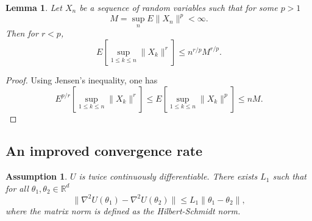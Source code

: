 \documentclass[a4paper]{article}
\newtheorem{lemma}[theorem]{Lemma}
\newtheorem{assumption}[theorem]{Assumption}
\begin{document}
\begin{lemma}\label{maximal}
	Let $X_n$ be a sequence of random variables such that for some $p > 1$
	$$M = \sup_n E\|X_n\|^p < \infty.$$
	Then for $r < p$,
	$$ E\left[ \sup_{1 \le k \le n}\|X_k\|^r \right] \le n^{r/p} M^{r/p}.$$
\end{lemma}
\begin{proof}
	Using Jensen's inequality, one has
	$$E^{p/r}\left[ \sup_{1 \le k \le n}\|X_k\|^r \right] \le E \left[ \sup_{1 \le k \le n}\|X_k\|^p \right] \le nM.$$
\end{proof}

\subsection{An improved convergence rate}\label{sec_rate1}

\begin{assumption}\label{assrate1} $U$ is twice continuously differentiable. There exists $L_1$ such that for all $\theta_1, \theta_2 \in \mathbb{R}^d$
	\[
	\|\nabla^2 U(\theta_1) - \nabla^2 U(\theta_2)\| \leq L_1 \|\theta_1 - \theta_2\|,
	\]
    where the matrix norm is defined as the Hilbert-Schmidt norm.
\end{assumption}
\end{document}

